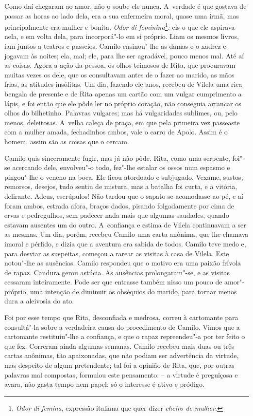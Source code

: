 Como daí chegaram ao amor, não o soube ele nunca. A~verdade é que
gostava de passar as horas ao lado dela, era a sua enfermeira moral,
quase uma irmã, mas principalmente era mulher e bonita. \emph{Odor di
feminina}\footnote{\emph{Odor di femina}, expressão italiana que quer
  dizer \emph{cheiro de mulher. }}\emph{:} eis o que ele aspirava nela,
e em volta dela, para incorporá"-lo em si próprio. Liam os mesmos livros,
iam juntos a teatros e passeios. Camilo ensinou"-lhe as damas e o xadrez
e jogavam às noites; ela, mal; ele, para lhe ser agradável, pouco menos
mal. Até aí as coisas. Agora a ação da pessoa, os olhos teimosos de
Rita, que procuravam muitas vezes os dele, que os consultavam antes de o
fazer ao marido, as mãos frias, as atitudes insólitas. Um dia, fazendo
ele anos, recebeu de Vilela uma rica bengala de presente e de Rita
apenas um cartão com um vulgar cumprimento a lápis, e foi então que ele
pôde ler no próprio coração, não conseguia arrancar os olhos do
bilhetinho. Palavras vulgares; mas há vulgaridades sublimes, ou, pelo
menos, deleitosas. A~velha caleça de praça, em que pela primeira vez
passeaste com a mulher amada, fechadinhos ambos, vale o carro de Apolo.
Assim é o homem, assim são as coisas que o cercam.

Camilo quis sinceramente fugir, mas já não pôde. Rita, como uma
serpente, foi"-se acercando dele, envolveu"-o todo, fez"-lhe estalar os
ossos num espasmo e pingou"-lhe o veneno na boca. Ele ficou atordoado e
subjugado. Vexame, sustos, remorsos, desejos, tudo sentiu de mistura,
mas a batalha foi curta, e a vitória, delirante. Adeus, escrúpulos! Não
tardou que o sapato se acomodasse ao pé, e aí foram ambos, estrada
afora, braços dados, pisando folgadamente por cima de ervas e
pedregulhos, sem padecer nada mais que algumas saudades, quando estavam
ausentes um do outro. A~confiança e estima de Vilela continuavam a ser
as mesmas. Um dia, porém, recebeu Camilo uma carta anônima, que lhe
chamava imoral e pérfido, e dizia que a aventura era sabida de todos.
Camilo teve medo e, para desviar as suspeitas, começou a rarear as
visitas à casa de Vilela. Este notou"-lhe as ausências. Camilo respondeu
que o motivo era uma paixão frívola de rapaz. Candura gerou astúcia. As
ausências prolongaram"-se, e as visitas cessaram inteiramente. Pode ser
que entrasse também nisso um pouco de amor"-próprio, uma intenção de
diminuir os obséquios do marido, para tornar menos dura a aleivosia do
ato.

Foi por esse tempo que Rita, desconfiada e medrosa, correu à cartomante
para consultá"-la sobre a verdadeira causa do procedimento de Camilo.
Vimos que a cartomante restituiu"-lhe a confiança, e que o rapaz
repreendeu"-a por ter feito o que fez. Correram ainda algumas semanas.
Camilo recebeu mais duas ou três cartas anônimas, tão apaixonadas, que
não podiam ser advertência da virtude, mas despeito de algum
pretendente; tal foi a opinião de Rita, que, por outras palavras mal
compostas, formulou este pensamento: -- a virtude é preguiçosa e avara,
não gasta tempo nem papel; só o interesse é ativo e pródigo.

